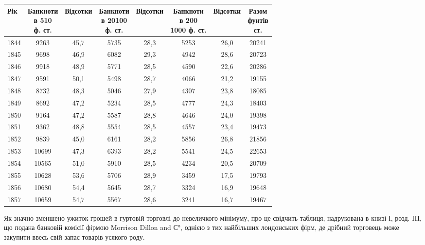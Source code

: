
\begin{table}[h]
  \small
  \begin{tabular}{l c c c c c c c}
  \toprule
Рік  &  \makecell{Банкноти\\ в 5\textendash{}10 \\ф. ст.} & Відсотки  &
\makecell{Банкноти\\ в 20\textendash{}100\\ ф. ст.} & Відсотки  &  \makecell{Банкноти\\ в 200\textendash{}\\1000
ф. ст.} & Відсотки &   \makecell{Разом\\  фунтів \\ ст.} \\
  \midrule
1844    &     \phantom{0}9263  &  45,7  &  5735 & 28,3 & 5253 &   26,0 &   20241\\
1845    &     \phantom{0}9698  &  46,9  &  6082 & 29,3 & 4942 &   28,6 &   20723\\
1846    &     \phantom{0}9918  &  48,9  &  5771 & 28,5 & 4590 &   22,6 &   20286\\
1847    &     \phantom{0}9591  &  50,1  &  5498 & 28,7 & 4066 &   21,2 &   19155\\
1848    &     \phantom{0}8732  &  48,3  &  5046 & 27,9 & 4307 &   23,8 &   18085\\
1849    &     \phantom{0}8692  &  47,2  &  5234 & 28,5 & 4777 &   24,3 &   18403\\
1850    &     \phantom{0}9164  &  47,2  &  5587 & 28,8 & 4646 &   24,0 &   19398\\
1851    &     \phantom{0}9362  &  48,8  &  5554 & 28,5 & 4557 &   23,4 &   19473\\
1852    &     \phantom{0}9839  &  45,0  &  6161 & 28,2 & 5856 &   26,8 &   21856\\
1853    &     10699 &  47,3  &  6393 & 28,2 & 5541 &   24,5 &   22653\\
1854    &     10565 &  51,0  &  5910 & 28,5 & 4234 &   20,5 &   20709\\
1855    &     10628 &  53,6  &  5706 & 28,9 & 3459 &   17,5 &   19793\\
1856    &     10680 &  54,4  &  5645 & 28,7 & 3324 &   16,9 &   19648\\
1857    &     10659 &  54,7  &  5567 & 28,6 & 3241 &   16,7 &   19467\\
\end{tabular}
\end{table}
Як значно зменшено ужиток грошей в гуртовій торговлі до невеличкого
мінімуму, про це свідчить таблиця, надрукована в книзі І, розд. III,
що подана банковій комісії фірмою Morrison Dillon and С°, однією з тих найбільших
лондонських фірм, де дрібний торговець може закупити ввесь свій запас
товарів усякого роду.

